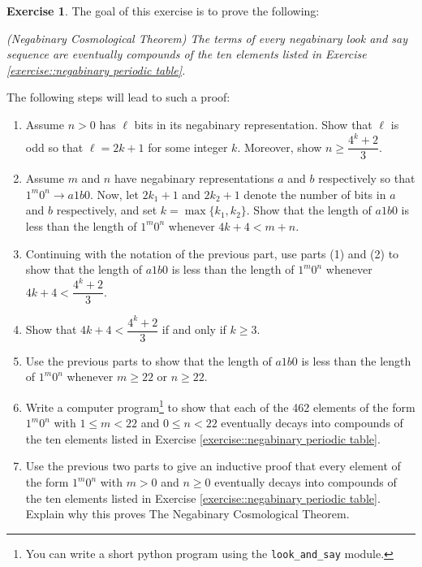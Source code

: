 \documentclass[reqno]{amsart}
\theoremstyle{definition}
\newtheorem{exercise}[theorem]{Exercise}
\begin{document}
\begin{exercise} 
The goal of this exercise is to prove the following:

\medskip

\noindent \emph{(Negabinary Cosmological Theorem) The terms of every negabinary look and say sequence are eventually compounds of the ten elements listed in Exercise \ref{exercise::negabinary periodic table}.}

\medskip

\noindent The following steps will lead to such a proof:

\begin{enumerate}
    \item Assume $n>0$ has $\ell$ bits in its negabinary representation. Show that $\ell$ is odd so that $\ell=2k+1$ for some integer $k$. Moreover, show $n\geq\dfrac{4^k+2}{3}$.
    \item Assume $m$ and $n$ have negabinary representations $a$ and $b$ respectively so that $1^m0^n\to a1b0$. Now, let $2k_1+1$ and $2k_2+1$ denote the number of bits in $a$ and $b$ respectively, and set $k=\max\{k_1,k_2\}$. Show that the length of $a1b0$ is less than the length of $1^m0^n$ whenever $4k+4<m+n$.
    \item Continuing with the notation of the previous part, use parts (1) and (2) to show that the length of $a1b0$ is less than the length of $1^m0^n$ whenever $4k+4<\dfrac{4^k+2}{3}$.
    \item Show that $4k+4<\dfrac{4^k+2}{3}$ if and only if $k\geq 3$. 
    \item Use the previous parts to show that the length of $a1b0$ is less than the length of $1^m0^n$ whenever $m\geq 22$ or $n\geq 22$.
    \item Write a computer program\footnote{You can write a short python program using the \texttt{look\_and\_say} module.} to show that each of the 462 elements of the form $1^m0^n$ with $1\leq m<22$ and $0\leq n<22$ eventually decays into compounds of the ten elements listed in Exercise \ref{exercise::negabinary periodic table}.
    \item Use the previous two parts to give an inductive proof that every element of the form $1^m0^n$ with $m>0$ and $n\geq 0$ eventually decays into compounds of the ten elements listed in Exercise \ref{exercise::negabinary periodic table}. Explain why this proves The Negabinary Cosmological Theorem. 
\end{enumerate}

\end{exercise}
\end{document}
